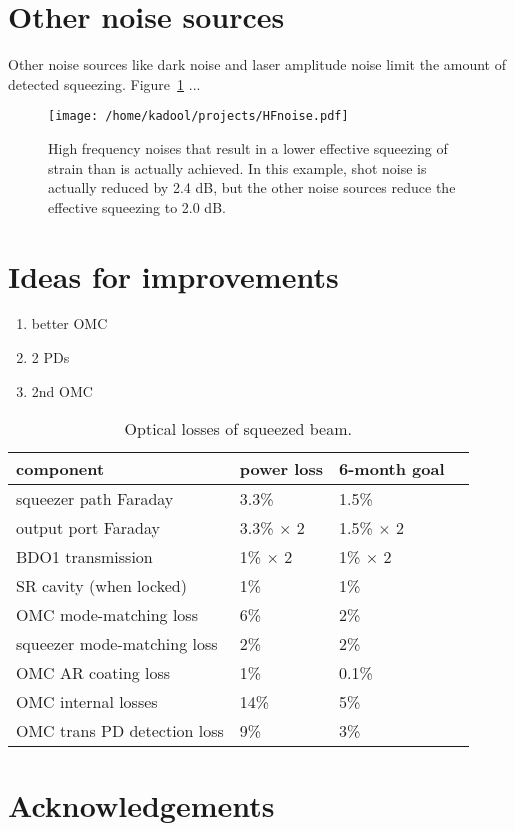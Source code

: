 \documentclass{ligodoc}
\begin{document}
\section{Other noise sources}
Other noise sources like dark noise and laser amplitude noise limit
the amount of detected squeezing. Figure~\ref{fig:HFnoises} ...

\begin{figure}
\begin{centering}
\texttt{[image: /home/kadool/projects/HFnoise.pdf]}
\caption{High frequency noises that result in a lower effective
  squeezing of strain than is actually achieved. In this example, shot
  noise is actually reduced by 2.4 dB, but the other noise sources
  reduce the effective squeezing to 2.0 dB.}
\label{fig:HFnoises}
\end{centering}
\end{figure}



\section{Ideas for improvements}
\label{sec:future}

\begin{enumerate}
\item better OMC
\item 2 PDs
\item 2nd OMC

\end{enumerate}



\begin{table}
\centering
\caption{Optical losses of squeezed beam.}
\begin{tabular}{l l l l} %
\hline
component & power loss & 6-month goal \\
\hline
squeezer path Faraday & 3.3\% & 1.5\% \\
output port Faraday & 3.3\% $\times$ 2 & 1.5\% $\times$ 2 \\
BDO1 transmission & 1\% $\times$ 2 & 1\% $\times$ 2 \\
SR cavity (when locked) & 1\% & 1\% \\
OMC mode-matching loss & 6\% & 2\% \\
squeezer mode-matching loss & 2\% & 2\% \\
OMC AR coating loss & 1\% & 0.1\% \\
OMC internal losses & 14\% & 5\% \\
OMC trans PD detection loss & 9\% & 3\% \\
\hline
\end{tabular}
\label{tab:losses_goal}
\end{table}



\section{Acknowledgements}
\end{document}
